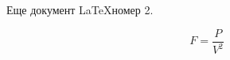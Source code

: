 \documentclass{article}
\begin{document}
Еще документ \LaTeX номер 2.

$$ F=\frac{P}{V^2} $$
\end{document}
